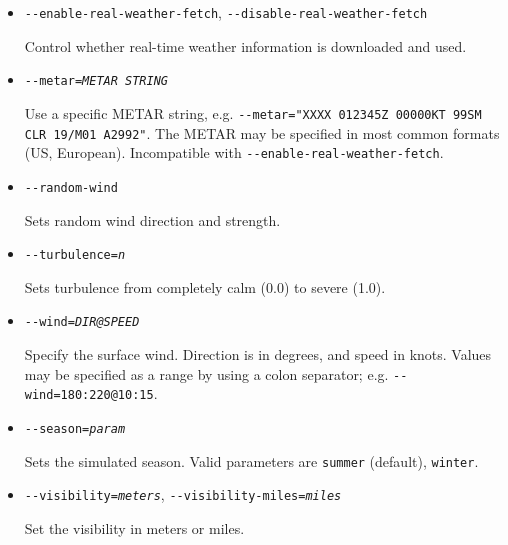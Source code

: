 \begin{itemize}
{\begin{itemize}
  Sets an overcase ceiling at a particular height, and with an optional thickness (defaults to 2000ft).

  \item{\texttt{-$ $-enable-real-weather-fetch}, \texttt{-$ $-disable-real-weather-fetch}}

  Control whether real-time weather information is downloaded and used.

  \item{\texttt{-$ $-metar={\it METAR STRING}}}

  Use a specific METAR string, e.g. \texttt{-$ $-metar="XXXX 012345Z 00000KT 99SM CLR 19/M01 A2992"}. The METAR may
  be specified in most common formats (US, European). Incompatible with \texttt{-$ $-enable-real-weather-fetch}.

  \item{\texttt{-$ $-random-wind}}

  Sets random wind direction and strength.

  \item{\texttt{-$ $-turbulence={\it n}}}

  Sets turbulence from completely calm (0.0) to severe (1.0).

  \item{\texttt{-$ $-wind={\it DIR@SPEED}}}

  Specify the surface wind. Direction is in degrees, and speed in knots. Values may be specified as a range
  by using a colon separator; e.g. \texttt{-$ $-wind=180:220@10:15}.

  \item{\texttt{-$ $-season={\it param}}}

  Sets the simulated season. Valid parameters are \texttt{summer} (default), \texttt{winter}.

  \item{\texttt{-$ $-visibility={\it meters}}, \texttt{-$ $-visibility-miles={\it miles}}}

  Set the visibility in meters or miles.

  \end{itemize}
}

\end{itemize}
